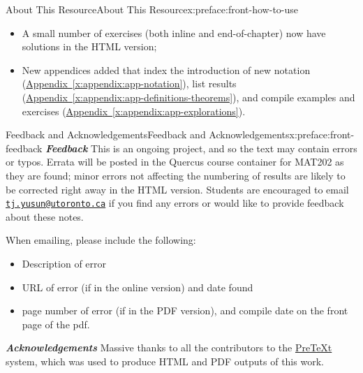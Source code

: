 \documentclass[oneside,10pt,]{book}
\newcommand{\xreffont}{\relax}
\newcommand{\mono}[1]{\texttt{#1}}
\newcommand{\alert}[1]{\textbf{\textit{#1}}}
\numberwithin{equation}{section}
\begin{document}
\begin{preface}{About This Resource}{}{About This Resource}{}{}{x:preface:front-how-to-use}
\begin{itemize}[label=\textbullet]
\item{}A small number of exercises (both inline and end-of-chapter) now have solutions in the HTML version;%
\item{}New appendices added that index the introduction of new notation (\hyperref[x:appendix:app-notation]{Appendix~{\xreffont\ref{x:appendix:app-notation}}}), list results (\hyperref[x:appendix:app-definitions-theorems]{Appendix~{\xreffont\ref{x:appendix:app-definitions-theorems}}}), and compile examples and exercises (\hyperref[x:appendix:app-explorations]{Appendix~{\xreffont\ref{x:appendix:app-explorations}}}).%
\end{itemize}
%
\end{preface}
%
%
\typeout{************************************************}
\typeout{************************************************}
%
\begin{preface}{Feedback and Acknowledgements}{}{Feedback and Acknowledgements}{}{}{x:preface:front-feedback}
\alert{Feedback} This is an ongoing project, and so the text may contain errors or typos. Errata will be posted in the Quercus course container for MAT202 as they are found; minor errors not affecting the numbering of results are likely to be corrected right away in the HTML version. Students are encouraged to email \href{mailto:tj.yusun@utoronto.ca?subject=202notes-pretext}{\mono{tj.yusun@utoronto.ca}} if you find any errors or would like to provide feedback about these notes.%
\par
When emailing, please include the following:%
\begin{itemize}[label=\textbullet]
\item{}Description of error%
\item{}URL of error (if in the online version) and date found%
\item{}page number of error (if in the PDF version), and compile date on the front page of the pdf.%
\end{itemize}
%
\par
\alert{Acknowledgements} Massive thanks to all the contributors to the \href{https://pretextbook.org/}{PreTeXt} system, which was used to produce HTML and PDF outputs of this work.%
\end{preface}
\setcounter{tocdepth}{1}
\renewcommand*\contentsname{Contents}
\tableofcontents
\mainmatter
%
%
\typeout{************************************************}
\end{document}
